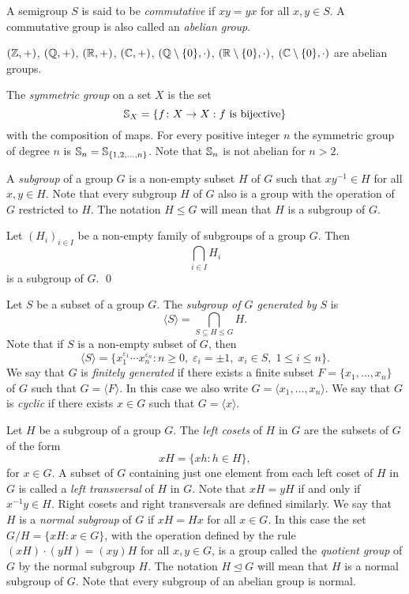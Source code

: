 A semigroup $S$ is said to be {\em commutative} if $xy=yx$ for all $x,y\in S$. A commutative group is also called an {\em abelian group}.

\begin{example}
 $(\mathbb{Z}, +)$,  $(\mathbb{Q}, +)$, $(\mathbb{R}, +)$, $(\mathbb{C}, +)$, $(\mathbb{Q}\setminus\{0\}, \cdot)$, $(\mathbb{R}\setminus\{0\}, \cdot)$, 
	$(\mathbb{C}\setminus\{0\}, \cdot)$ are abelian groups.
\end{example}

\begin{example}
The {\em symmetric group} on a set $X$ is the set 
\[
\mathbb{S}_X=\{ f\colon X\rightarrow X: f \mbox{ is bijective}\}
\]
with the composition of maps. For every positive integer $n$ the symmetric group of degree $n$ is
$\mathbb{S}_n=\mathbb{S}_{\{ 1,2,\dots ,n\}}$. Note that $\mathbb{S}_n$ is not abelian for $n>2$.
\end{example}    

A {\em subgroup} of a group $G$ is a non-empty subset $H$ of $G$ such that $xy^{-1}\in H$ for all $x,y\in H$. 
Note that every subgroup $H$ of $G$ also is a group with the operation of $G$ restricted to $H$.
The notation $H\leq G$ will mean that $H$ is a subgroup of $G$.

\begin{proposition}
\label{intersection}
	Let $(H_i)_{i\in I}$ be a non-empty family of subgroups of a group $G$. Then 
	\[ 
	\bigcap_{i\in I}H_i 
	\]
    is a subgroup of $G$. \qed
\end{proposition}   

Let $S$ be a subset of a group $G$. The \emph{subgroup of $G$ generated by} 
$S$ is
\[
\langle S\rangle=\bigcap_{S\subseteq H\leq G}H.
\]
Note that if $S$ is a non-empty subset of $G$, then
\[
\langle S\rangle=\{ x_1^{\varepsilon_1}\cdots x_n^{\varepsilon_n}: n\geq0,\; \varepsilon_i=\pm 1,\; x_i\in S,\; 1\leq i\leq n \}.
\]
We say that $G$ is {\em finitely generated} if there exists a finite subset $F=\{ x_1,\dots ,x_n\}$ of $G$ such that $G=\langle F\rangle$. In this case we also write $G=\langle x_1,\dots ,x_n\rangle$. We say that $G$ is {\em cyclic} if there exists $x\in G$ such that $G=\langle x\rangle$. 

Let $H$ be a subgroup of a group $G$. The {\em left cosets} of $H$ in $G$ are 
the subsets of $G$ of the form
\[
xH=\{ xh: h\in H\},
\]
for $x\in G$. A subset of $G$ containing just one element from each left coset of $H$ in $G$ is called a {\em left transversal} of $H$ in $G$. 
Note that $xH=yH$ if and only if $x^{-1}y\in H$.
Right cosets and right transversals are defined similarly.
We say that $H$ is a {\em normal subgroup} of $G$ if $xH=Hx$ for all $x\in G$. In this case the set
$G/H=\{xH: x\in G\}$, with the operation defined by the rule $(xH)\cdot (yH)=(xy)H$ for all $x,y\in G$, 
is a group called the {\em quotient group} of $G$ by the normal subgroup $H$. 
The notation $H\unlhd G$ will mean that $H$ is a normal subgroup of $G$.
Note that every subgroup of an abelian group is normal.

